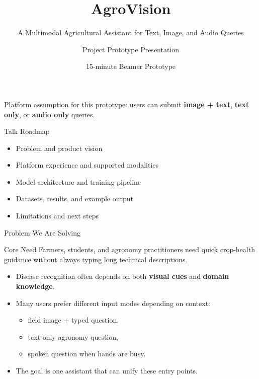 \documentclass[aspectratio=169,11pt]{beamer}
\title{AgroVision}
\subtitle{A Multimodal Agricultural Assistant for Text, Image, and Audio Queries}
\author{Project Prototype Presentation}
\date{15-minute Beamer Prototype}
\begin{document}
{
\begin{frame}[plain]
    \titlepage
    \vspace{-0.6em}
    {\color{AgroCream}\small
    Platform assumption for this prototype:
    users can submit \textbf{image + text}, \textbf{text only}, or \textbf{audio only} queries.}
\end{frame}
}

\begin{frame}{Talk Roadmap}
\begin{itemize}
    \item Problem and product vision
    \item Platform experience and supported modalities
    \item Model architecture and training pipeline
    \item Datasets, results, and example output
    \item Limitations and next steps
\end{itemize}
\end{frame}

\begin{frame}{Problem We Are Solving}
\begin{block}{Core Need}
Farmers, students, and agronomy practitioners need quick crop-health guidance without always typing long technical descriptions.
\end{block}
\vspace{0.4em}
\begin{itemize}
    \item Disease recognition often depends on both \textbf{visual cues} and \textbf{domain knowledge}.
    \item Many users prefer different input modes depending on context:
    \begin{itemize}
        \item field image + typed question,
        \item text-only agronomy question,
        \item spoken question when hands are busy.
    \end{itemize}
    \item The goal is one assistant that can unify these entry points.
\end{itemize}
\end{frame}
\end{document}
